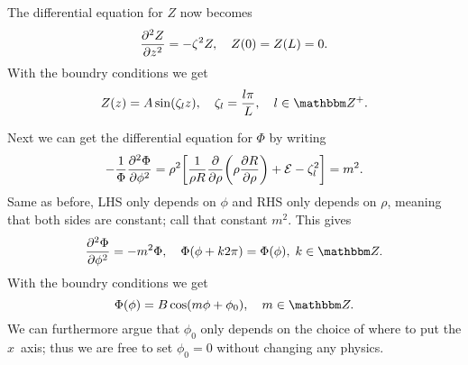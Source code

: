 \documentclass[11pt,letter, swedish, english
]{article}
\begin{document}
The differential equation for $Z$ now becomes
\begin{equation}
\pdv[2]{Z}{z}=-\zeta^2Z\qcomma
Z(0)=Z(L)=0.
\end{equation}
With the boundry conditions we get
\begin{equation}\label{eq:5a_Z}
Z(z)=A\sin(\zeta_l z)\qcomma 
\zeta_l=\frac{l\pi}{L}\qcomma l\in\Z^+.
\end{equation}

Next we can get the differential equation for $\Phi$ by writing
\begin{equation}
-\frac{1}{\Phi}\pdv[2]{\Phi}{\phi} 
= \rho^2\qty[\frac{1}{\rho R}\pdv{\rho}
\qty(\rho\pdv{R}{\rho})+\mathcal{E}-\zeta_l^2]
=m^2.
\end{equation}
Same as before, LHS only depends on $\phi$ and RHS only depends on
$\rho$, meaning that both sides are constant; call that constant
$m^2$. This gives
\begin{equation}
\pdv[2]{\Phi}{\phi} =-m^2\Phi\qcomma
\Phi(\phi+k2\pi)=\Phi(\phi),\;k\in\Z.
\end{equation}
With the boundry conditions we get
\begin{equation}
\Phi(\phi)=B\cos(m\phi+\phi_0)\qcomma
m\in\Z.
\end{equation}
We can furthermore argue that $\phi_0$ only depends on the choice of
where to put the $x$~axis; thus we are free to set $\phi_0=0$ without
changing any physics.
\end{document}
